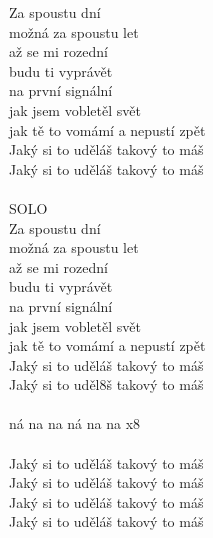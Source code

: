 \begin{multicols}{2}
Za spoustu dní \\
možná za spoustu let\\
až se mi rozední \\
budu ti vyprávět\\
na první signální \\
jak jsem vobletěl svět\\
jak tě to vomámí a nepustí zpět\\
Jaký si to uděláš takový to máš\\
Jaký si to uděláš takový to máš\\
\\
SOLO
\columnbreak
\\
Za spoustu dní \\
možná za spoustu let\\
až se mi rozední \\
budu ti vyprávět\\
na první signální\\
jak jsem vobletěl svět\\
jak tě to vomámí a nepustí zpět\\
Jaký si to uděláš takový to máš\\
Jaký si to uděl8š takový to máš\\
\\
ná na na ná na na x8\\
\\
Jaký si to uděláš takový to máš\\
Jaký si to uděláš takový to máš\\
Jaký si to uděláš takový to máš\\
Jaký si to uděláš takový to máš\\
\end{multicols}
